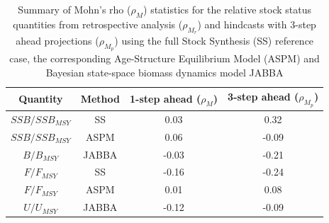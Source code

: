 \documentclass[12pt,halfline,a4paper,nonumbib]{ouparticle}
\begin{document}
\begin{table}[!ht]
\caption{Summary of Mohn's rho ($\rho_{M}$) statistics for the relative stock status quantities from retrospective analysis ($\rho_{M_r}$) and hindcasts with 3-step ahead projections ($\rho_{M_p}$) using the full Stock Synthesis (SS) reference case, the corresponding Age-Structure Equilibrium Model (ASPM) and Bayesian state-space biomass dynamics model JABBA}  
\begin{center}
\label{tab:retro-rho}
\begin{tabular}{|cccc|}
\hline
{\small Quantity} & \small Method & {\small 1-step ahead ($\rho_{M}$)} & {\small 3-step ahead ($\rho_{M_p}$)} \\ 
\hline\hline
{\small $SSB/SSB_{MSY}$     } & {\small SS} 	 & {\small    0.03} & {\small  0.32}      \\
{\small $SSB/SSB_{MSY}$     } & {\small ASPM} 	 & {\small    0.06} & {\small -0.09}      \\
{\small $B/B_{MSY}$         } & {\small JABBA} 	 & {\small   -0.03} & {\small -0.21}      \\
{\small $F/F_{MSY}$         } & {\small SS} 	 & {\small   -0.16} & {\small -0.24}      \\
{\small $F/F_{MSY}$         } & {\small ASPM} 	 & {\small    0.01} & {\small  0.08}      \\
{\small $U/U_{MSY}$         } & {\small JABBA} 	 & {\small   -0.12} & {\small -0.09}      \\
\hline
\end{tabular}
\end{center}
\end{table}
\end{document}
